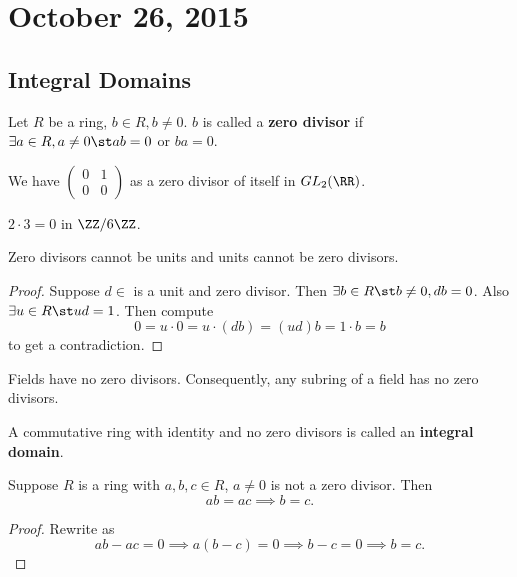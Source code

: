 \section{October 26, 2015}

\subsection{Integral Domains}

\begin{df}
Let $R$ be a ring, $b \in R, b \neq 0$. $b$ is called a \textbf{zero
divisor} if $\exists a \in R, a \neq 0 \st ab = 0$ or $ba = 0$.
\end{df}

\begin{ex}
We have $\begin{pmatrix} 0 & 1 \\ 0 & 0 \end{pmatrix}$ as a zero divisor
of itself in $GL_2(\RR)$.
\end{ex}

\begin{ex}
$2 \cdot 3 = 0$ in $\ZZ / 6 \ZZ$.
\end{ex}

\begin{prop}
Zero divisors cannot be units and units cannot be zero divisors.
\end{prop}

\begin{proof}
Suppose $d \in $ is a unit and zero divisor. Then $\exists b \in R \st b
\neq 0, db = 0$. Also $\exists u \in R \st ud = 1$. Then compute
\[ 0 = u \cdot 0 = u \cdot (db) = (ud)b = 1 \cdot b = b \]
to get a contradiction.
\end{proof}

\begin{rem}
Fields have no zero divisors. Consequently, any subring of a field has
no zero divisors.
\end{rem}

\begin{df}
A commutative ring with identity and no zero divisors is called an
\textbf{integral domain}.
\end{df}

\begin{prop}
Suppose $R$ is a ring with $a, b, c \in R$, $a \neq 0$ is not a zero
divisor. Then
\[ ab = ac \implies b = c. \]
\end{prop}

\begin{proof}
Rewrite as
\[ ab - ac = 0 \implies a(b - c) = 0 \implies b - c = 0 \implies b = c.
\]
\end{proof}

